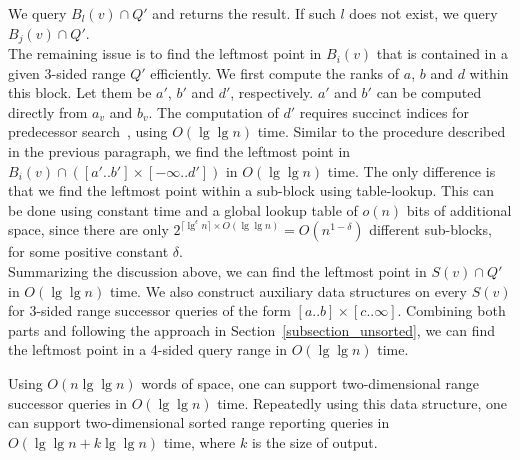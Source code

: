 \documentclass{llncs}
\begin{document}
We query $B_l(v) \cap Q'$ and returns the result.
If such $l$ does not exist, we query $B_j(v) \cap Q'$. \\
\indent The remaining issue is to find the leftmost point in $B_i(v)$ that is contained in a given 3-sided range $Q'$ efficiently.
We first compute the ranks of $a$, $b$ and $d$ within this block.
Let them be $a'$, $b'$ and $d'$, respectively.
$a'$ and $b'$ can be computed directly from $a_v$ and $b_v$.
The computation of $d'$ requires succinct indices for predecessor search~\cite{DBLP:conf/stacs/GrossiORR09}, using $O(\lg\lg n)$ time.
Similar to the procedure described in the previous paragraph,
we find the leftmost point in $B_i(v) \cap ([a'..b']\times[-\infty..d'])$ in $O(\lg\lg n)$ time.
The only difference is that we find the leftmost point within a sub-block using table-lookup.
This can be done using constant time and a global lookup table of $o(n)$ bits of additional space,
since there are only $2^{\lceil \lg^\epsilon n \rceil \times O(\lg\lg n)} = O(n^{1 - \delta})$ different sub-blocks,
for some positive constant $\delta$. \\
\indent Summarizing the discussion above, we can find the leftmost point in $S(v) \cap Q'$ in $O(\lg\lg n)$ time.
We also construct auxiliary data structures on every $S(v)$ for 3-sided range successor queries
of the form $[a..b]\times[c..\infty]$.
Combining both parts and following the approach in Section~\ref{subsection_unsorted},
we can find the leftmost point in a 4-sided query range in $O(\lg\lg n)$ time.
\begin{theorem}
    Using $O(n\lg\lg n)$ words of space, one can support two-dimensional range successor queries in $O(\lg\lg n)$ time.
    Repeatedly using this data structure, one can support two-dimensional sorted range reporting queries in $O(\lg\lg n + k\lg\lg n)$ time,
    where $k$ is the size of output.
\end{theorem}

\begin{comment}
\section{Making it Adaptive}
\label{section_adaptive}

We can make the data structure presented in Section~\ref{section_main} adaptive at almost no cost.
We build the adaptive range counting data structure of Chan and Wilkinson~\cite{DBLP:conf/soda/ChanW13}.
This data structure supports range counting queries using $O(n\lg\lg n)$ words of space and $O(\lg\lg n + \lg k / \lg\lg n)$ query time,
where $k$ is the number of points in the query range.
The key idea in their work is \emph{shallow cuttings}~\cite{DBLP:journals/comgeo/Matousek92}.
A $k$-shallow cutting consists of $O(n / k)$ cells, each containing a subset of $O(k)$ points .

\cite{DBLP:journals/siamcomp/Chan00}
\end{comment}


\end{document}

